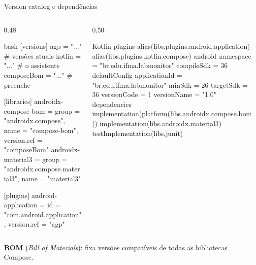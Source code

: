 \documentclass[aspectratio=169,10pt]{beamer}
\begin{document}
\begin{frame}[fragile]{Version catalog e dependências}
  \begin{columns}[T]
    \begin{column}{0.48\textwidth}
\begin{codigo}[title=gradle/libs.versions.toml,listing options={style=dm,language=bash,basicstyle=\ttfamily\tiny}]{bash}
[versions]
agp = "..."             # versões atuais
kotlin = "..."          # o assistente
composeBom = "..."      # preenche

[libraries]
androidx-compose-bom = { group = "androidx.compose",
  name = "compose-bom", version.ref = "composeBom" }
androidx-material3 = { group = "androidx.compose.material3",
  name = "material3" }

[plugins]
android-application = { id = "com.android.application",
  version.ref = "agp" }
\end{codigo}
    \end{column}
    \begin{column}{0.50\textwidth}
\begin{codigo}[title=app/build.gradle.kts,listing options={style=dm,language=Kotlin,basicstyle=\ttfamily\tiny}]{Kotlin}
plugins {
  alias(libs.plugins.android.application)
  alias(libs.plugins.kotlin.compose)
}
android {
  namespace = "br.edu.ifma.labmonitor"
  compileSdk = 36
  defaultConfig {
    applicationId = "br.edu.ifma.labmonitor"
    minSdk = 26
    targetSdk = 36
    versionCode = 1
    versionName = "1.0"
  }
}
dependencies {
  implementation(platform(libs.androidx.compose.bom))
  implementation(libs.androidx.material3)
  testImplementation(libs.junit)
}
\end{codigo}
    \end{column}
  \end{columns}
  \begin{caixadestaque}
    \textbf{BOM} (\emph{Bill of Materials}): fixa versões compatíveis de todas as bibliotecas Compose.
  \end{caixadestaque}
\end{frame}
\end{document}
